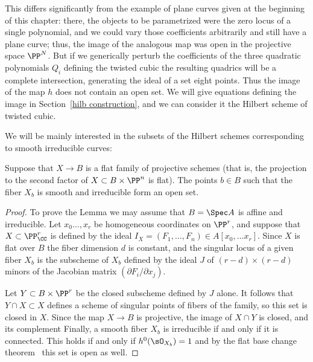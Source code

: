 This differs significantly from the example of plane curves given at the beginning of this chapter: there, the objects to be parametrized were the zero locus of a single polynomial, and we could vary those coefficients arbitrarily and still have a plane curve; thus, the image of the analogous map was open in the projective space $\PP^N$. But if we generically
perturb the coefficients of the three quadratic polynomials $Q_i$ defining the twisted cubic the resulting quadrics will
be a complete intersection, generating
 the ideal of a set eight points. Thus the image of the map $h$ does not contain an open set.
We will give equations defining the image in Section~\ref{hilb construction}, and we can consider it
the Hilbert scheme of twisted cubic.

We will be mainly  interested in the subsets of the Hilbert schemes corresponding to smooth irreducible curves:

\begin{lemma}\label{smooth is open}
Suppose that $X \to B$ is a flat family of projective schemes (that is, the projection to the second factor of 
$X\subset B\times \PP^n$  is flat). The points $b\in B$ such that the fiber $X_b$ is smooth and irreducible form an open set.
\end{lemma}

\begin{proof}
To prove the Lemma we may assume that $B = \Spec A$ is affine and irreducible. Let $x_{0}\dots, x_{r}$ be homogeneous coordinates
on $\PP^{r}$, and suppose that 
$X\subset \PP^{r}_{\CC}$ is defined by the ideal $I_{X} = (F_{1}, \dots, F_{n}) \in A[x_{0}, \dots x_{r}]$.
Since $X$ is flat over $B$ the fiber dimension $d$ is constant, and the singular locus 
of a given fiber $X_{b}$ is  the subscheme of $X_{b}$ defined by the ideal $J$ of
$(r-d)\times (r-d)$ minors of the Jacobian matrix $(\partial F_{i}/\partial x_{j})$.

Let $Y\subset B\times \PP^{r}$ be the closed subscheme defined by $J$ alone. 
It follows that $Y\cap X \subset X$ defines a scheme of singular points of fibers of the family, so this set is closed
in $X$.
Since the map $X \to B$ is projective, the image of $X\cap Y$ is closed, and its complement
 Finally, a smooth fiber $X_b$ is irreducible if and only if it is connected. This holds if and only if $h^0(\sO_{X_b}) = 1$ and by the flat base change theorem~\cite[Theorem 12.11]{Hartshorne1977} this set is open as well.
\end{proof}


